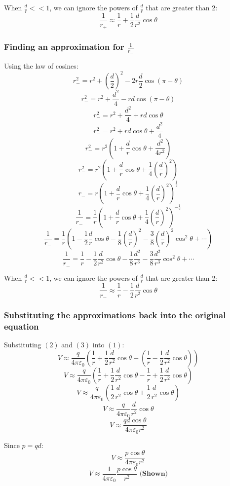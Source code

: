 \documentclass[11pt]{article}
\begin{document}
When \(\frac{d}{r} << 1\), we can ignore the powers of \(\frac{d}{r}\) that are greater than 2:
\[\frac{1}{r_+} \approx \frac{1}{r} + \frac{1}{2} \frac{d}{r^2} \cos \theta \tag{2}\]

\newpage
\subsubsection{Finding an approximation for \(\frac{1}{r_-}\)}
\label{sec:orge024f71}
Using the law of cosines:
\[r_-^2 = r^2 + \left(\frac{d}{2} \right)^2 - 2r \frac{d}{2} \cos (\pi - \theta)\]
\[r_-^2 = r^2 + \frac{d^2}{4} - rd \cos (\pi - \theta)\]
\[r_-^2 = r^2 + \frac{d^2}{4} + rd \cos \theta\]
\[r_-^2 = r^2 + rd \cos \theta + \frac{d^2}{4}\]
\[r_-^2 = r^2 \left(1 + \frac{d}{r} \cos \theta + \frac{d^2}{4r^2} \right)\]
\[r_-^2 = r^2 \left(1 + \frac{d}{r} \cos \theta + \frac{1}{4} \left( \frac{d}{r} \right)^2 \right)\]
\[r_- = r \left(1 + \frac{d}{r} \cos \theta + \frac{1}{4} \left( \frac{d}{r} \right)^2 \right)^{\frac{1}{2}}\]
\[\frac{1}{r_-} = \frac{1}{r} \left(1 + \frac{d}{r} \cos \theta + \frac{1}{4} \left( \frac{d}{r} \right)^2 \right)^{-\frac{1}{2}}\]
\[\frac{1}{r_-} = \frac{1}{r} \left(1 - \frac{1}{2} \frac{d}{r} \cos \theta - \frac{1}{8} \left( \frac{d}{r} \right)^2 - \frac{3}{8} \left( \frac{d}{r} \right)^2 \cos^2 \theta + \cdots \right)\]
\[\frac{1}{r_-} = \frac{1}{r} - \frac{1}{2} \frac{d}{r^2} \cos \theta - \frac{1}{8} \frac{d^2}{r^3} - \frac{3}{8} \frac{d^2}{r^3} \cos^2 \theta + \cdots\]

When \(\frac{d}{r} << 1\), we can ignore the powers of \(\frac{d}{r}\) that are greater than 2:
\[\frac{1}{r_-} \approx \frac{1}{r} - \frac{1}{2} \frac{d}{r^2} \cos \theta \tag{3}\]

\newpage
\subsubsection{Substituting the approximations back into the original equation}
\label{sec:orgae66e4f}
Substituting \((2)\) and \((3)\) into \((1)\):
\[V \approx \frac{q}{4 \pi \varepsilon_0} \left( \frac{1}{r} + \frac{1}{2} \frac{d}{r^2} \cos \theta - \left(\frac{1}{r} - \frac{1}{2} \frac{d}{r^2} \cos \theta \right) \right)\]
\[V \approx \frac{q}{4 \pi \varepsilon_0} \left( \frac{1}{r} + \frac{1}{2} \frac{d}{r^2} \cos \theta - \frac{1}{r} + \frac{1}{2} \frac{d}{r^2} \cos \theta \right)\]
\[V \approx \frac{q}{4 \pi \varepsilon_0} \left(\frac{1}{2} \frac{d}{r^2} \cos \theta + \frac{1}{2} \frac{d}{r^2} \cos \theta \right)\]
\[V \approx \frac{q}{4 \pi \varepsilon_0} \frac{d}{r^2} \cos \theta\]
\[V \approx \frac{qd \cos \theta}{4 \pi \varepsilon_0 r^2}\]

Since \(p = qd\):
\[V \approx \frac{p \cos \theta}{4 \pi \varepsilon_0 r^2}\]
\[V \approx \frac{1}{4 \pi \varepsilon_0} \frac{p \cos \theta}{r^2} \textbf{ (Shown)}\]
\end{document}
